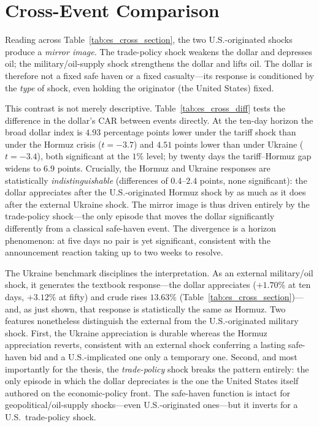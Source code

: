 \section{Cross-Event Comparison}
\label{sec:es_comparison}

Reading across Table~\ref{tab:es_cross_section}, the two U.S.-originated shocks produce a
\emph{mirror image}. The trade-policy shock weakens the dollar and depresses oil; the
military/oil-supply shock strengthens the dollar and lifts oil. The dollar is therefore
not a fixed safe haven or a fixed casualty---its response is conditioned by the
\emph{type} of shock, even holding the originator (the United States) fixed.

This contrast is not merely descriptive. Table~\ref{tab:es_cross_diff} tests the
difference in the dollar's CAR between events directly. At the ten-day horizon the broad
dollar index is $4.93$ percentage points lower under the tariff shock than under the
Hormuz crisis ($t=-3.7$) and $4.51$ points lower than under Ukraine ($t=-3.4$), both
significant at the $1\%$ level; by twenty days the tariff--Hormuz gap widens to $6.9$
points. Crucially, the Hormuz and Ukraine responses are statistically
\emph{indistinguishable} (differences of $0.4$--$2.4$ points, none significant): the
dollar appreciates after the U.S.-originated Hormuz shock by as much as it does after the
external Ukraine shock. The mirror image is thus driven entirely by the trade-policy
shock---the only episode that moves the dollar significantly differently from a classical
safe-haven event. The divergence is a horizon phenomenon: at five days no pair is yet
significant, consistent with the announcement reaction taking up to two weeks to resolve.



The Ukraine benchmark disciplines the interpretation. As an external military/oil shock,
it generates the textbook response---the dollar appreciates ($+1.70\%$ at ten days,
$+3.12\%$ at fifty) and crude rises $13.63\%$ (Table~\ref{tab:es_cross_section})---and,
as just shown, that response is statistically the same as Hormuz. Two features
nonetheless distinguish the external from the U.S.-originated military shock. First, the
Ukraine appreciation is durable whereas the Hormuz appreciation reverts, consistent with
an external shock conferring a lasting safe-haven bid and a U.S.-implicated one only a
temporary one. Second, and most importantly for the thesis, the \emph{trade-policy} shock
breaks the pattern entirely: the only episode in which the dollar depreciates is the one
the United States itself authored on the economic-policy front. The safe-haven function
is intact for geopolitical/oil-supply shocks---even U.S.-originated ones---but it inverts
for a U.S.\ trade-policy shock.

